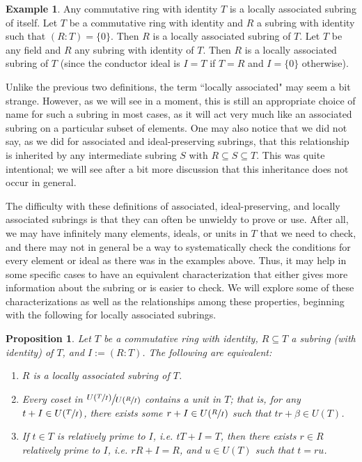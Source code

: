 \documentclass[12pt]{amsart}
\newtheorem{proposition}[theorem]{Proposition}
\theoremstyle{definition}
\newtheorem{example}[theorem]{Example}
\newcommand{\quot}[2]{\large\sfrac{#1}{#2}\normalsize}
\begin{document}
	\begin{example}
		Any commutative ring with identity $T$ is a locally associated subring of itself. Let $T$ be a commutative ring with identity and $R$ a subring with identity such that $(R:T)=\{0\}$. Then $R$ is a locally associated subring of $T$. Let $T$ be any field and $R$ any subring with identity of $T$. Then $R$ is a locally associated subring of $T$ (since the conductor ideal is $I=T$ if $T=R$ and $I=\{0\}$ otherwise). 
	\end{example}
	
	Unlike the previous two definitions, the term ``locally associated" may seem a bit strange. However, as we will see in a moment, this is still an appropriate choice of name for such a subring in most cases, as it will act very much like an associated subring on a particular subset of elements. One may also notice that we did not say, as we did for associated and ideal-preserving subrings, that this relationship is inherited by any intermediate subring $S$ with  $R\subseteq S\subseteq T$. This was quite intentional; we will see after a bit more discussion that this inheritance does not occur in general.
	
	The difficulty with these definitions of associated, ideal-preserving, and locally associated subrings is that they can often be unwieldy to prove or use. After all, we may have infinitely many elements, ideals, or units in $T$ that we need to check, and there may not in general be a way to systematically check the conditions for every element or ideal as there was in the examples above. Thus, it may help in some specific cases to have an equivalent characterization that either gives more information about the subring or is easier to check. We will explore some of these characterizations as well as the relationships among these properties, beginning with the following for locally associated subrings.
	
	\begin{proposition}
		\label{la first conditions}
		Let $T$ be a commutative ring with identity, $R\subseteq T$ a subring (with identity) of $T$, and $I:=(R:T)$. The following are equivalent:
		\begin{enumerate}
			\item $R$ is a locally associated subring of $T$.
			\item Every coset in $\quot{U(\sfrac{T}{I})}{U(\sfrac{R}{I})}$ contains a unit in $T$; that is, for any $t+I\in U(\sfrac{T}{I})$, there exists some $r+I\in U(\sfrac{R}{I})$ such that $tr+\beta\in U(T)$.
			\item If $t\in T$ is relatively prime to $I$, i.e. $tT+I=T$, then there exists $r\in R$ relatively prime to $I$, i.e. $rR+I=R$, and $u\in U(T)$ such that $t=ru$.
		\end{enumerate}
	\end{proposition}
	
\end{document}
